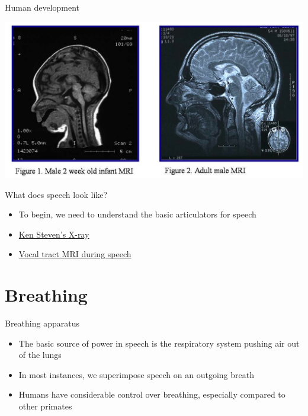 \documentclass[professionalfonts]{beamer}
\begin{document}
\begin{frame}{Human development}
    \begin{center}
        \includegraphics[width = \textwidth]{figs/HumanChildAdultMRI.png}
    \end{center}
\end{frame}

\begin{frame}{What does speech look like?}
    \begin{itemize}
        \item To begin, we need to understand the basic articulators for speech
        \item \href{https://youtu.be/DcNMCB-Gsn8?feature=shared}{Ken Steven's X-ray}
        \item \href{https://youtu.be/Wrbe5fH888k?feature=shared}{Vocal tract MRI during speech}
    \end{itemize}
\end{frame}

\section*{Breathing}

\begin{frame}{Breathing apparatus}
    \begin{itemize}
        \item The basic source of power in speech is the respiratory system pushing air out of the lungs
        \item In most instances, we superimpose speech on an outgoing breath
        \item Humans have considerable control over breathing, especially compared to other primates
    \end{itemize}
\end{frame}
\end{document}
